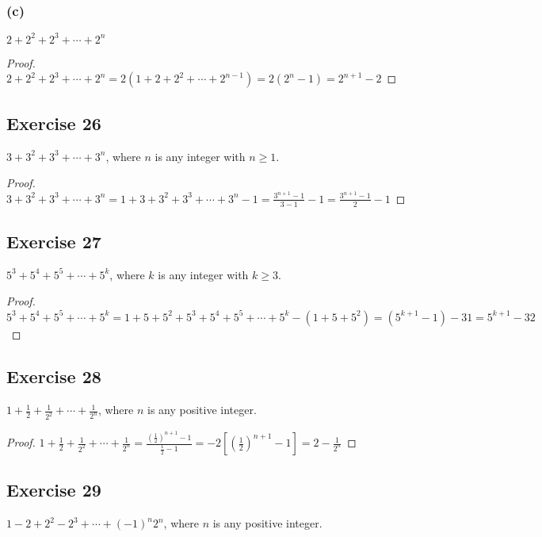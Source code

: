 \documentclass[14pt]{extarticle}
\newcommand{\dps}{\displaystyle}
\begin{document}
\subsubsection{(c)}
$2 + 2^2 + 2^3 + \cdots + 2^n$

\begin{proof}
    $2 + 2^2 + 2^3 + \cdots + 2^{n} = 2(1 + 2 + 2^2 + \cdots + 2^{n-1}) = 2(2^{n} - 1) = 2^{n+1}-2$
\end{proof}

\subsection{Exercise 26}
$3 + 3^2 + 3^3 + \cdots + 3^n$, where $n$ is any integer with $n \geq 1$.

\begin{proof}
    $\dps 3 + 3^2 + 3^3 + \cdots + 3^n = 1 + 3 + 3^2 + 3^3 + \cdots + 3^n - 1 = \frac{3^{n+1}-1}{3-1} - 1 = \frac{3^{n+1}-1}{2} - 1$
\end{proof}

\subsection{Exercise 27}
$5^3 + 5^4 + 5^5 + \cdots + 5^k$, where $k$ is any integer with $k \geq 3$.

\begin{proof}
    $5^3 + 5^4 + 5^5 + \cdots + 5^k = 1 + 5 + 5^2 + 5^3 + 5^4 + 5^5 + \cdots + 5^k - (1 + 5 + 5^2) = (5^{k+1} - 1) - 31 = 5^{k+1} - 32$
\end{proof}

\subsection{Exercise 28}
$\dps 1 + \frac{1}{2} + \frac{1}{2^2} + \cdots + \frac{1}{2^n}$, where $n$ is any positive integer.

\begin{proof}
    $\dps 1 + \frac{1}{2} + \frac{1}{2^2} + \cdots + \frac{1}{2^n} = \frac{\left(\frac{1}{2}\right)^{n+1} - 1}{\frac{1}{2} - 1} = -2\left[\left(\frac{1}{2}\right)^{n+1} - 1\right] = 2 - \frac{1}{2^n}$
\end{proof}

\subsection{Exercise 29}
$1 - 2 + 2^2 - 2^3 + \cdots + (-1)^n 2^n$, where $n$ is any positive integer.
\end{document}
